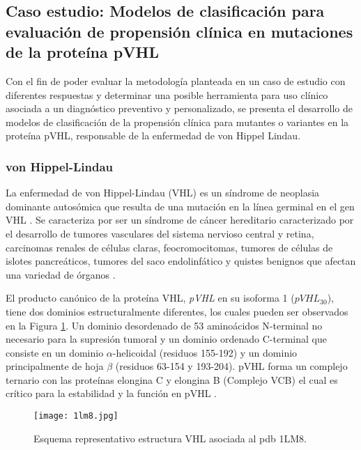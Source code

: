 \subsection{Caso estudio: Modelos de clasificación para evaluación de propensión clínica en mutaciones de la proteína pVHL}

Con el fin de poder evaluar la metodología planteada en un caso de estudio con diferentes respuestas y determinar una posible herramienta para uso clínico asociada a un diagnóstico preventivo y personalizado, se presenta el desarrollo de modelos de clasificación de la propensión clínica para mutantes o variantes en la proteína pVHL, responsable de la enfermedad de von Hippel Lindau.

\subsubsection{von Hippel-Lindau}

La enfermedad de von Hippel-Lindau (VHL) es un síndrome de neoplasia dominante autosómica que resulta de una mutación en la línea germinal en el gen VHL \cite{Kluijtmans1996, vogelstein2002genetic, jamaVHL, CLIFFORD200185, Maher443, KaelinJr2002, LONSER20032059}. Se caracteriza por ser un síndrome de cáncer hereditario caracterizado por el desarrollo de tumores vasculares del sistema nervioso central y retina, carcinomas renales de células claras, feocromocitomas, tumores de células de islotes pancreáticos, tumores del saco endolinfático y quistes benignos que afectan una variedad de órganos \cite{Maher443}. 

El producto canónico de la proteína VHL, \textit{pVHL} en su isoforma 1 ($pVHL_{30}$), tiene dos dominios estructuralmente diferentes, los cuales pueden ser observados en la Figura \ref{vhlView}. Un dominio desordenado de 53 aminoácidos N-terminal no necesario para la supresión tumoral y un dominio ordenado C-terminal que consiste en un dominio $\alpha$-helicoidal (residuos 155-192) y un dominio principalmente de hoja $\beta$ (residuos 63-154 y 193-204). pVHL forma un complejo ternario con las proteínas elongina C y elongina B (Complejo VCB) \cite{duan1995inhibition, Kishida4544}  el cual es crítico para la estabilidad  y la función en pVHL \cite{Schoenfeld8507}.

\begin{figure}[!h]
	\centering
	\texttt{[image: 1lm8.jpg]}
	\caption{Esquema representativo estructura VHL asociada al pdb 1LM8.}
	\label{vhlView}
\end{figure}


